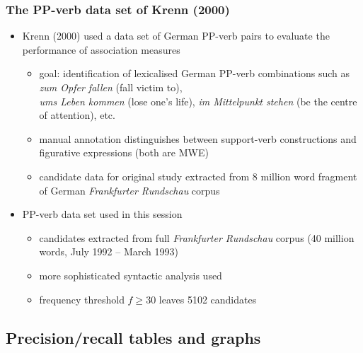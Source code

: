 \documentclass[t]{beamer} %
\begin{document}
\begin{frame}
  \frametitle{The PP-verb data set of Krenn (2000)}

  \begin{itemize}
  \item Krenn (2000) used a data set of German PP-verb pairs to evaluate
    the performance of association measures
    \begin{itemize}
    \item goal: identification of lexicalised German PP-verb combinations such
      as \emph{zum Opfer fallen} (fall victim to),\\ \emph{ums Leben kommen}
      (lose one's life), \emph{im Mittelpunkt stehen} (be the centre of
      attention), etc.
    \item manual annotation distinguishes between support-verb constructions
      and figurative expressions (both are MWE)
    \item candidate data for original study extracted from 8 million word
      fragment of German \emph{Frankfurter Rundschau} corpus
    \end{itemize}
  \item PP-verb data set used in this session
    \begin{itemize}
    \item candidates extracted from full \emph{Frankfurter Rundschau} corpus
      (40 million words, July 1992 -- March 1993)
    \item more sophisticated syntactic analysis used
    \item frequency threshold $f\geq 30$ leaves 5102 candidates
    \end{itemize}
  \end{itemize}
\end{frame}

\subsection{Precision/recall tables and graphs}
\end{document}
